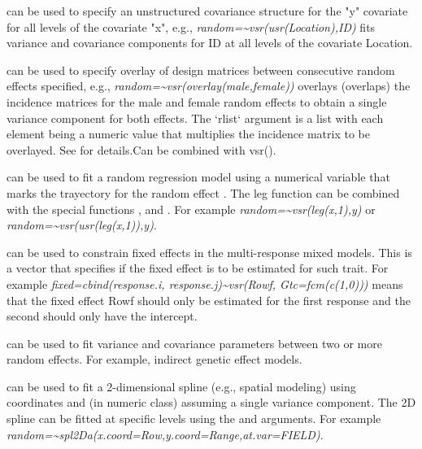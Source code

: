 \documentclass[a4paper]{book}
\begin{document}
\begin{Details}

can be used to specify an unstructured covariance structure for the "y" covariate for all levels of the  covariate "x", e.g., \emph{random=\textasciitilde{}vsr(usr(Location),ID)}  fits variance and covariance components for ID at all levels of the covariate Location.


can be used to specify overlay of design matrices between consecutive random effects specified, e.g., \emph{random=\textasciitilde{}vsr(overlay(male,female))} overlays (overlaps) the incidence matrices for the male and female random effects to obtain a single variance component for both effects. The `rlist` argument is a list with each element being a numeric value that multiplies the incidence matrix to be overlayed. See  for details.Can be combined with vsr().


can be used to fit a random regression model using a numerical variable  that marks the trayectory for the random effect . The leg function can be combined with the special functions ,   and . For example \emph{random=\textasciitilde{}vsr(leg(x,1),y)} or \emph{random=\textasciitilde{}vsr(usr(leg(x,1)),y)}.


can be used to constrain fixed effects in the multi-response mixed models. This is a vector that specifies if the fixed effect is to be estimated for such trait. For example \emph{fixed=cbind(response.i, response.j)\textasciitilde{}vsr(Rowf, Gtc=fcm(c(1,0)))} means that the fixed effect Rowf should only be estimated for the first response and the second should only have the intercept.


can be used to fit variance and covariance parameters between two or more random effects. For example, indirect genetic effect models.


can be used to fit a 2-dimensional spline (e.g., spatial modeling) using coordinates  and  (in numeric class) assuming a single variance component. The 2D spline can be fitted at specific levels using the  and  arguments. For example \emph{random=\textasciitilde{}spl2Da(x.coord=Row,y.coord=Range,at.var=FIELD)}.


\end{Details}
\end{document}
